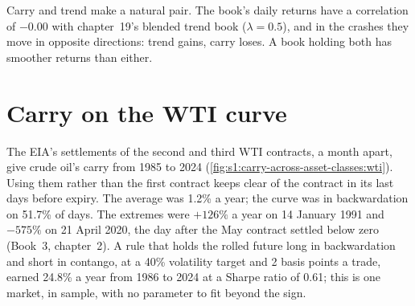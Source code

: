 \begin{omfigure}

\label{fig:s1:carry-across-asset-classes:paths}
\end{omfigure}

Carry and trend make a natural pair. The  book's daily returns have a correlation of $-0.00$ with chapter~19's blended trend book
($\lambda = 0.5$), and in the crashes they move in opposite directions: trend gains, carry loses. A book holding both has smoother returns than
either.

\section{Carry on the WTI curve}

The EIA's settlements of the second and third WTI contracts, a month apart, give crude oil's carry from 1985 to 2024 (\cref{fig:s1:carry-across-asset-classes:wti}).
Using them rather than the first contract keeps clear of the contract in its last days before expiry. The average was 1.2\% a year; the curve was in
backwardation on 51.7\% of days. The extremes were $+126\%$ a year on 14 January 1991 and $-575\%$ on 21 April 2020, the day after the May
contract settled below zero (Book~3, chapter~2). A rule that holds the rolled future long in backwardation and short in contango, at a 40\% volatility
target and 2 basis points a trade, earned 24.8\% a year from 1986 to 2024 at a Sharpe ratio of 0.61; this is one market, in sample, with no parameter to
fit beyond the sign.

